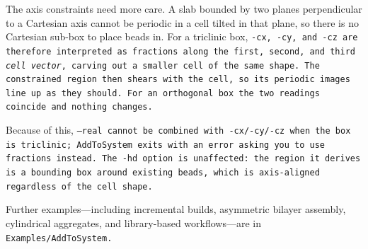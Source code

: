 The axis constraints need more care. A slab bounded by two planes perpendicular
to a Cartesian axis cannot be periodic in a cell tilted in that plane, so there
is no Cartesian sub-box to place beads in. For a triclinic box, \tt{-cx},
\tt{-cy}, and \tt{-cz} are therefore interpreted as fractions along the first,
second, and third \emph{cell vector}, carving out a smaller cell of the same
shape. The constrained region then shears with the cell, so its periodic images
line up as they should. For an orthogonal box the two readings coincide and
nothing changes.

Because of this, \tt{--real} cannot be combined with \tt{-cx}/\tt{-cy}/\tt{-cz}
when the box is triclinic; \tt{AddToSystem} exits with an error asking you to
use fractions instead. The \tt{-hd} option is unaffected: the region it derives
is a bounding box around existing beads, which is axis-aligned regardless of
the cell shape.

Further examples---including incremental builds, asymmetric bilayer assembly,
cylindrical aggregates, and library-based workflows---are in
\tt{Examples/AddToSystem}.

